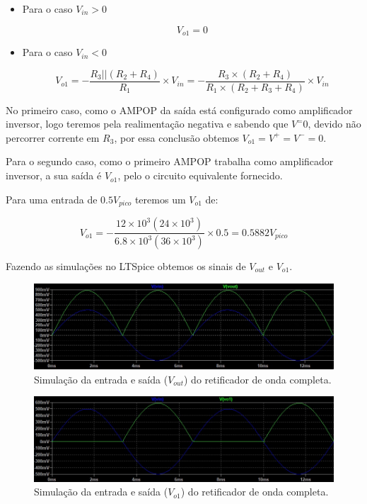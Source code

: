 \begin{itemize}
    \item Para o caso $V_{in}>0$ \\
    \begin{center}
        \begin{equation} \label{vsat+}
            V_{o1} = 0 
        \end{equation}
    \end{center}

    \item Para o caso $V_{in}<0$ \\
    
    \begin{center}
        \begin{equation} \label{vsat+}
            V_{o1} = -\frac{R_3||(R_2+R_4)}{R_1} \times V_{in} = -\frac{R_3 \times (R_2+R_4)}{R_1 \times(R_2 + R_3 + R_4)}\times V_{in}
        \end{equation}
    \end{center}
\end{itemize}

No primeiro caso, como o AMPOP da saída está configurado como amplificador inversor, logo teremos pela realimentação negativa e sabendo que $V^= 0$, devido não percorrer corrente em $R_3$, por essa conclusão obtemos  $V_{o1} = V^+ = V^- = 0$.

Para o segundo caso, como o primeiro AMPOP trabalha como amplificador inversor, a sua saída é $V_{o1}$, pelo o circuito equivalente fornecido.

Para uma entrada de $0.5V_{pico}$ teremos um $V_{o1}$ de: \\

\begin{center}
        \begin{equation} \label{vsat+}
            V_{o1} = -\frac{12\times10^3 (24\times10^3)}{6.8\times10^3(36\times10^3)}\times 0.5 = 0.5882 V_{pico}
        \end{equation}
    \end{center}
    

Fazendo as simulações no LTSpice obtemos os sinais de $V_{out}$ e $V_{o1}$.

\begin{figure}[H] 
\centering
\includegraphics[scale=0.6]{images/vo_2.jpg}
\caption{Simulação da entrada e saída ($V_{out}$) do retificador de onda completa.}
\label{fig1} 
\end{figure}

\begin{figure}[H] 
\centering
\includegraphics[scale=0.6]{images/vo_3.jpg}
\caption{Simulação da entrada e saída ($V_{o1}$) do retificador de onda completa.}
\label{fig1} 
\end{figure}